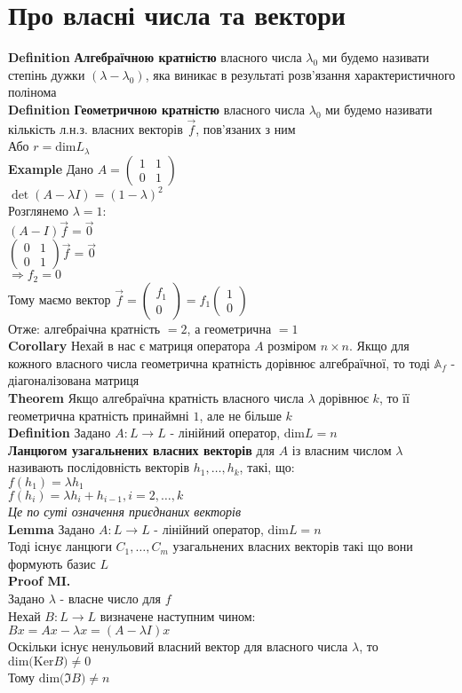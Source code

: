 \documentclass[a4paper, 14pt]{extarticle}
\def\defin#1{\textbf{Definition {#1}}}
\def\ex#1{\textbf{Example {#1}}}
\def\lm#1{\textbf{Lemma {#1}}}
\def\th#1{\textbf{Theorem {#1}}}
\def\crl#1{\textbf{Corollary {#1}}}
\def\proofMI{\textbf{Proof MI.}\\}
\def\bigline{\vspace{5mm}\\}
\def\dim#1{\textrm{dim} {#1}}
\def\ker#1{\textrm{Ker} {#1}}
\begin{document}
\section*{Про власні числа та вектори}
\defin{} \textbf{Алгебраїчною кратністю} власного числа $\lambda_0$ ми будемо називати степінь дужки $(\lambda - \lambda_0)$, яка виникає в результаті розв'язання характеристичного полінома
\bigline
\defin{} \textbf{Геометричною кратністю} власного числа $\lambda_0$ ми будемо називати кількість л.н.з. власних векторів $\vec{f}$, пов'язаних з ним\\
Або $r = \dim L_{\lambda}$
\bigline
\ex{} Дано $A = \begin{pmatrix}
1 & 1 \\
0 & 1
\end{pmatrix}$\\
$\det(A-\lambda I) = (1-\lambda)^2$\\
Розглянемо $\lambda = 1$:\\
$(A-I)\vec{f} = \vec{0}$\\
$\begin{pmatrix}
0 & 1 \\
0 & 1
\end{pmatrix} \vec{f} = \vec{0}$\\
$\Rightarrow f_2 = 0$\\
Тому маємо вектор $\vec{f} = \begin{pmatrix}
f_1 \\ 0
\end{pmatrix} = f_1 \begin{pmatrix}
1 \\ 0
\end{pmatrix}$\\
Отже: алгебраічна кратність $= 2$, а геометрична $= 1$
\bigline
\crl{} Нехай в нас є матриця оператора $A$ розміром $n \times n$. Якщо для кожного власного числа геометрична кратність дорівнює алгебраїчної, то тоді $\mathbb{A}_f$ - діагоналізована матриця
\bigline
\th{} Якщо алгебраїчна кратність власного числа $\lambda$ дорівнює $k$, то її геометрична кратність принаймні $1$, але не більше $k$
\bigline
\defin{} Задано $A: L \to L$ - лінійний оператор, $\dim L = n$\\
\textbf{Ланцюгом узагальнених власних векторів} для $A$ із власним числом $\lambda$ називають послідовність векторів $h_1, \dots, h_k$, такі, що:\\
$f(h_1) = \lambda h_1$\\
$f(h_i) = \lambda h_i + h_{i-1}, i=2,\dots,k$\\
\textit{Це по суті означення приєднаних векторів}
\bigline
\lm{} Задано $A: L \to L$ - лінійний оператор, $\dim L = n$\\
Тоді існує ланцюги $C_1,\dots,C_m$ узагальнених власних векторів такі що вони формують базис $L$\\
\proofMI
Задано $\lambda$ - власне число для $f$\\
Нехай $B: L \to L$ визначене наступним чином:\\
$Bx = Ax - \lambda x = (A - \lambda I)x$\\
Оскільки існує ненульовий власний вектор для власного числа $\lambda$, то $\dim (\ker B) \neq 0$\\
Тому $\dim (\Im B) \neq n$\\
\newpage
\end{document}
